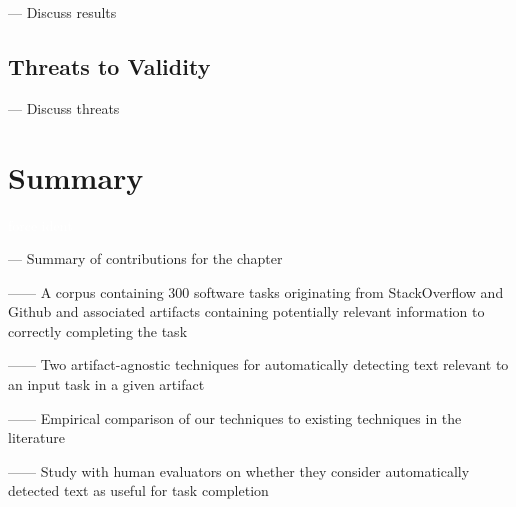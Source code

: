--- Discuss results \vspace{3mm}

\subsection{Threats to Validity}

--- Discuss threats \vspace{3mm}

\clearpage

\section{Summary}
\textcolor{white}{force ident} %

--- Summary of contributions for the chapter \vspace{3mm}

------ A corpus containing 300 software tasks originating from StackOverflow and Github and associated artifacts containing potentially relevant information to correctly completing the task \vspace{3mm}

------ Two artifact-agnostic techniques for automatically detecting text relevant to an input task in a given artifact

------ Empirical comparison of our techniques to existing techniques in the literature

------ Study with human evaluators on whether they consider automatically detected text as useful for task completion

